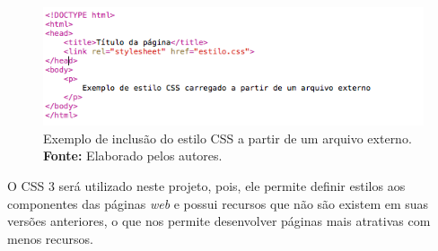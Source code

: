 \begin{itemize}
	\newpage
	\begin{figure}[h!]
		\centerline{\includegraphics[scale=0.8]{./imagens/example_external_css.png}}
		\caption[Exemplo de inclusão do estilo CSS a partir de um arquivo externo]
		{Exemplo de inclusão do estilo CSS a partir de um arquivo externo. \textbf{Fonte:} Elaborado pelos autores.}
		\label{fig:exemplo1}
	\end{figure}
	
\end{itemize}

O CSS 3 será utilizado neste projeto, pois, ele permite definir estilos aos componentes das páginas \textit{web} e possui recursos que não são existem em suas versões anteriores, o que nos permite desenvolver páginas mais atrativas com menos recursos.